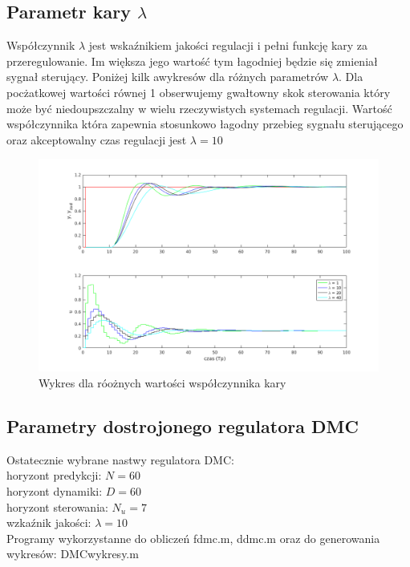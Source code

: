 \documentclass[a4paper, 11pt]{article}
\begin{document}
\subsection{Parametr kary $\lambda$}
Współczynnik $\lambda$ jest wskaźnikiem jakości regulacji i pełni funkcję kary za przeregulowanie. Im większa jego wartość tym łagodniej będzie się zmieniał sygnał sterujący. Poniżej kilk awykresów dla różnych parametrów $\lambda$. Dla pocżatkowej wartości równej 1 obserwujemy gwałtowny skok sterowania który może być niedoupszczalny w wielu rzeczywistych systemach regulacji. Wartość współczynnika która zapewnia stosunkowo łagodny przebieg sygnału sterującego oraz akceptowalny czas regulacji jest $\lambda = 10$
\begin{figure}[H]
\centering
\includegraphics[scale=0.60]{lambda_dmc.png}
\caption{Wykres dla róożnych wartości współczynnika kary}
\label{}
\end{figure}
\subsection{Parametry dostrojonego regulatora DMC}
Ostatecznie wybrane nastwy regulatora DMC:\\

horyzont predykcji: $N = 60$\\

horyzont dynamiki: $D = 60$\\

horyzont sterowania: $N_u = 7$\\

wzkaźnik jakości: $\lambda = 10$\\

\noindent Programy wykorzystanne do obliczeń fdmc.m, ddmc.m oraz do generowania wykresów: DMCwykresy.m\\
\end{document}

